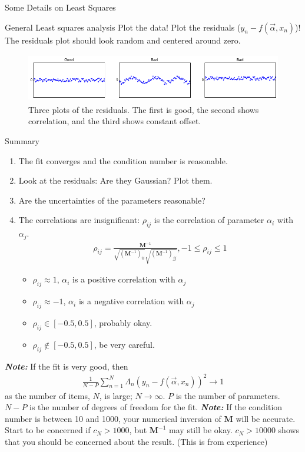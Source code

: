 \documentclass{article}
\newcommand{\matr}[1]{\bm{#1}}
\newcommand{\note}[1]{%
	\vspace{\parsep}%
	\textit{\textbf{Note: }}#1 \newline\newline
	\vspace{\parsep}}
\begin{document}
\begin{section}{Some Details on Least Squares}
\begin{subsection}{General Least squares analysis}
	Plot the data! Plot the residuals ($y_n - f(\vec{\alpha},x_n)$)! The residuals plot should look random and centered around zero.
	\begin{figure}[h]
		\centering
		\includegraphics[height=60pt]{residuals}
		\caption{Three plots of the residuals. The first is good, the second shows correlation, and the third shows constant offset.}
		\label{fig:residuals}
	\end{figure}
\end{subsection}
\begin{subsection}{Summary}
	\begin{enumerate}
		\item The fit converges and the condition number is reasonable.
		\item Look at the residuals: Are they Gaussian? Plot them.
		\item Are the uncertainties of the parameters reasonable?
		\item The correlations are insignificant: 
			$\rho_{ij}$ is the correlation of parameter $\alpha_i$ with $\alpha_j$.
			\begin{align*}
				\rho_{ij} =	\frac{\matr{M}^{-1}}{\sqrt{(\matr{M}^{-1})_{ii}}\sqrt{(\matr{M}^{-1})_{jj}}}, -1\leq \rho_{ij} \leq 1
			\end{align*}



			\begin{itemize}
					\item $\rho_{ij} \approx 1$, $\alpha_i$ is a positive correlation with $\alpha_j$
					\item $\rho_{ij} \approx -1$, $\alpha_i$ is a negative correlation with $\alpha_j$
					\item $\rho_{ij} \in [-0.5,0.5]$, probably okay.
					\item $\rho_{ij} \not\in [-0.5,0.5]$, be very careful.
			\end{itemize}
	\end{enumerate}
	\note{If the fit is very good, then 
		\begin{align*}
			\frac{1}{N-P}\sum_{n=1}^{N}\Lambda_n(y_n - f(\vec{\alpha},x_n))^2 \rightarrow 1
		\end{align*}
	as the number of items, $N$, is large; $N\rightarrow \infty$. $P$ is the number of parameters. $N-P$ is the number of degrees of freedom for the fit.}
	\note{If the condition number is between 10 and 1000, your numerical inversion of $\matr{M}$ will be accurate. Start to be concerned if $c_N > 1000$, but $\matr{M}^{-1}$ may still be okay. $c_N > 10000$ shows that you should be concerned about the result. (This is from experience)}
\end{subsection}
\end{section}
\end{document}
